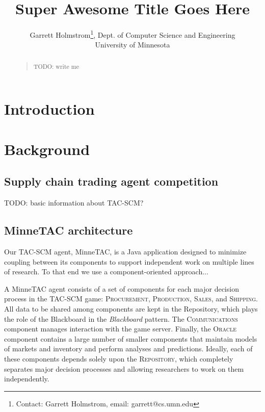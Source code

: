 \documentclass{article}
\begin{document}
\title{Super Awesome Title Goes Here}

\author{Garrett Holmstrom\thanks{Contact: Garrett Holmstrom, email: garrett@cs.umn.edu},
    Dept. of Computer Science and Engineering \\ University of Minnesota
}

\date{}

\maketitle

\begin{abstract}
\begin{quote}
TODO:  write me
\end{quote}
\end{abstract}

\section{Introduction}

\section{Background}

\subsection{Supply chain trading agent competition}
TODO:  basic information about TAC-SCM?

\subsection{MinneTAC architecture}

Our TAC-SCM agent, MinneTAC, is a Java application designed to minimize
coupling between its components to support independent work on multiple
lines of research.  To that end we use a component-oriented approach...

A MinneTAC agent consists of a set of components for each major decision
process in the TAC-SCM game: \textsc{Procurement}, \textsc{Production},
\textsc{Sales}, and \textsc{Shipping}.  All data to be shared
among components are kept in the Repository, which plays the role
of the Blackboard in the \emph{Blackboard} pattern\cite{Busch96}.
The \textsc{Communications} component manages interaction with the game
server.  Finally, the \textsc{Oracle} component contains a large number
of smaller components that maintain models of markets and inventory and
perform analyses and predictions.  Ideally, each of these components
depends solely upon the \textsc{Repository}, which completely separates
major decision processes and allowing researchers to work on them
independently.
\end{document}

